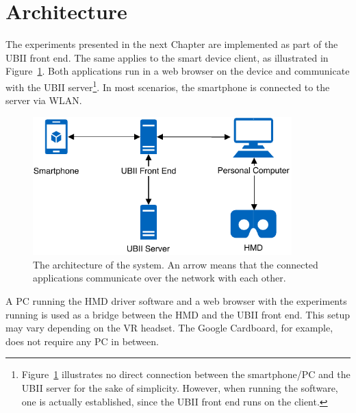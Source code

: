 \section{Architecture}\label{section:architecture}

The experiments presented in the next Chapter are implemented as part of the \ac{UBII} front end. The same applies to the smart device client, as illustrated in Figure~\ref{fig:architecture}. Both applications run in a web browser on the device and communicate with the \ac{UBII} server\footnote{Figure~\ref{fig:architecture} illustrates no direct connection between the smartphone/\ac{PC} and the \ac{UBII} server for the sake of simplicity. However, when running the software, one is actually established, since the \ac{UBII} front end runs on the client.}. In most scenarios, the smartphone is connected to the server via \ac{WLAN}.

\begin{figure}[H]
  \centering
  \includegraphics[width=10cm]{figures/implementation/architecture.pdf}
  \caption[The architecture of the system.]{The architecture of the system. An arrow means that the connected applications communicate over the network with each other.}\label{fig:architecture}
\end{figure}

A \ac{PC} running the \ac{HMD} driver software and a web browser with the experiments running is used as a bridge between the \ac{HMD} and the \ac{UBII} front end. This setup may vary depending on the \ac{VR} headset. The Google Cardboard, for example, does not require any \ac{PC} in between.

